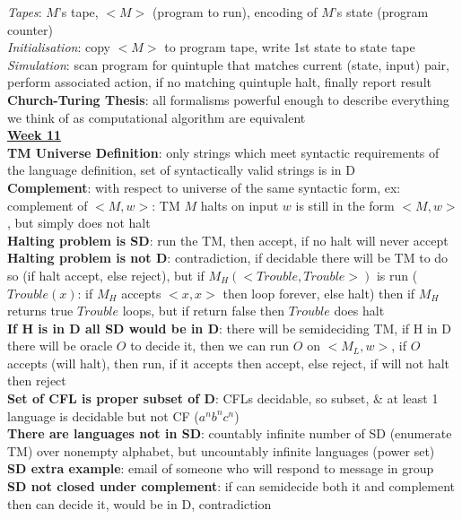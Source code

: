 \documentclass[a4paper]{article}
\begin{document}
\begin{multicols}{2}
        \textit{Tapes}: $M$'s tape, $<M>$ (program to run), encoding of $M$'s state (program counter)\\
        \textit{Initialisation}: copy $<M>$ to program tape, write 1st state to state tape\\
        \textit{Simulation}: scan program for quintuple that matches current (state, input) pair, perform associated action, if no matching quintuple halt, finally report result\\
        \textbf{Church-Turing Thesis}: all formalisms powerful enough to describe everything we think of as computational algorithm are equivalent\\
        \underline{\textbf{Week 11}}\\
        \textbf{TM Universe Definition}: only strings which meet syntactic requirements of the language definition, set of syntactically valid strings is in D\\
        \textbf{Complement}: with respect to universe of the same syntactic form, ex: complement of $<M,w>$: TM $M$ halts on input $w$ is still in the form $<M,w>$, but simply does not halt\\
        \textbf{Halting problem is SD}: run the TM, then accept, if no halt will never accept\\
        \textbf{Halting problem is not D}: contradiction, if decidable there will be TM to do so (if halt accept, else reject), but if $M_H(<Trouble, Trouble>)$ is run ($Trouble(x)$: if $M_H$ accepts $<x,x>$ then loop forever, else halt) then if $M_H$ returns true $Trouble$ loops, but if return false then $Trouble$ does halt\\
        \textbf{If H is in D all SD would be in D}: there will be semideciding TM, if H in D there will be oracle $O$ to decide it, then we can run $O$ on $<M_L,w>$, if $O$ accepts (will halt), then run, if it accepts then accept, else reject, if will not halt then reject\\
        \textbf{Set of CFL is proper subset of D}: CFLs decidable, so subset, \& at least 1 language is decidable but not CF ($a^n b^n c^n$)\\
        \textbf{There are languages not in SD}: countably infinite number of SD (enumerate TM) over nonempty alphabet, but uncountably infinite languages (power set)\\
        \textbf{SD extra example}: email of someone who will respond to message in group\\
        \textbf{SD not closed under complement}: if can semidecide both it and complement then can decide it, would be in D, contradiction\\

\end{multicols}
\end{document}

